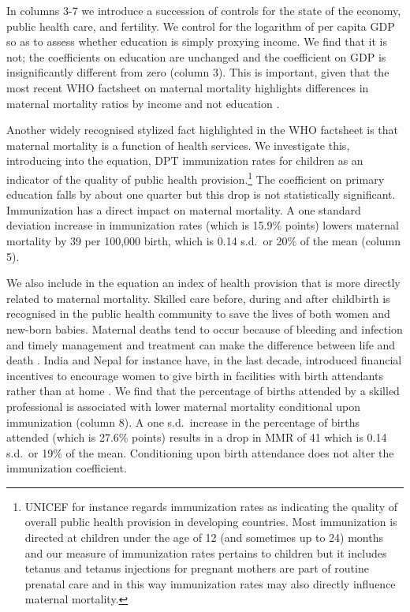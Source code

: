 \documentclass{article}[12pt,subeqn]
\begin{document}
\begin{spacing}{1.4}
In columns 3-7 we introduce a succession of controls for the state of the
economy, public health care, and fertility. We control for the logarithm of per 
capita GDP so as to assess whether education is simply proxying income. We find 
that it is not; the coefficients on education are unchanged and the coefficient 
on GDP is insignificantly different from zero (column 3). This is important, 
given that the most recent WHO factsheet on maternal mortality highlights 
differences in maternal mortality ratios by income and not education 
\citep{WHO2012}.

Another widely recognised stylized fact highlighted in the WHO factsheet is that 
maternal mortality is a function of health services. We investigate this, 
introducing into the equation, DPT immunization rates for children as an indicator 
of the quality of public health provision.\footnote{UNICEF for instance regards 
immunization rates as indicating the quality of overall public health provision 
in developing countries. Most immunization is directed at children under the age 
of 12 (and sometimes up to 24) months and our measure of immunization rates 
pertains to children but it includes tetanus and tetanus injections for pregnant 
mothers are part of routine prenatal care and in this way immunization rates may
also directly influence maternal mortality.} The coefficient on primary 
education falls by about one quarter but this drop is not statistically 
significant. Immunization has a direct impact on maternal mortality. A one 
standard deviation increase in immunization rates (which is 15.9\% points) lowers 
maternal mortality by 39 per 100,000 birth, which is 0.14 s.d.\ or 20\% of the 
mean (column 5).

We also include in the equation an index of health provision that is more 
directly related to maternal mortality. Skilled care before, during and after 
childbirth is recognised in the public health community to save the lives of both 
women and new-born babies. Maternal deaths tend to occur because of bleeding and
infection and timely management and treatment can make the difference between life 
and death \citep{WHO2012}. India and Nepal for instance have, in the last decade, 
introduced financial incentives to encourage women to give birth in facilities 
with birth attendants rather than at home \citep{Milleretal2012,
PowellJacksonHanson2012}. We find that the percentage of births attended by a 
skilled professional is associated with lower maternal mortality conditional upon 
immunization (column 8). A one s.d.\ increase in the percentage of births attended 
(which is 27.6\% points) results in a drop in MMR of 41 which is 0.14 s.d.\ or 19\% 
of the mean. Conditioning upon birth attendance does not alter the immunization 
coefficient.


\end{spacing}
\end{document}
